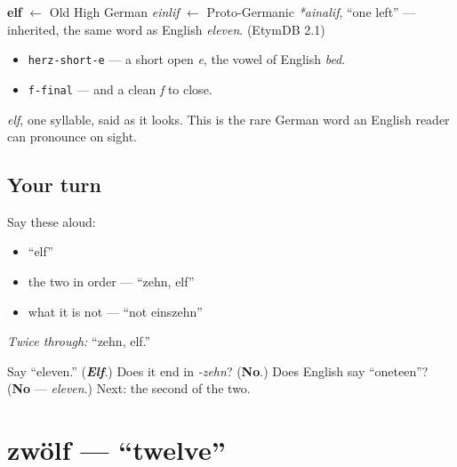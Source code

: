 \begin{cousinweb}
\textbf{elf} $\leftarrow$ Old High German \emph{einlif} $\leftarrow$ Proto-Germanic \emph{*ainalif}, \textquotedblleft{}one left\textquotedblright{} — inherited, the same word as English \emph{eleven}. (EtymDB 2.1)
\end{cousinweb}

\begin{sounds}
\begin{itemize}
\raggedright
  \item \texttt{herz-short-e} — a short open \emph{e}, the vowel of English \emph{bed}.
  \item \texttt{f-final} — and a clean \emph{f} to close.
\end{itemize}

\emph{elf}, one syllable, said as it looks. This is the rare German word an English reader can pronounce on sight.
\end{sounds}

\subsection*{Your turn}
Say these aloud:

\begin{itemize}
\raggedright
  \item \textquotedblleft{}elf\textquotedblright{}
  \item the two in order — \textquotedblleft{}zehn, elf\textquotedblright{}
  \item what it is not — \textquotedblleft{}not einszehn\textquotedblright{}
\end{itemize}

\emph{Twice through:} \textquotedblleft{}zehn, elf.\textquotedblright{}

\begin{tcolorbox}[breakable,colback=teal!4,colframe=teal!35!black,title={Before you move on}]
Say \textquotedblleft{}eleven.\textquotedblright{} (\emph{\textbf{Elf}}.) Does it end in \emph{-zehn}? (\textbf{No}.) Does English say \textquotedblleft{}oneteen\textquotedblright{}? (\textbf{No} — \emph{eleven}.) Next: the second of the two.
\end{tcolorbox}
\section[zwölf]{zwölf — \textquotedblleft{}twelve\textquotedblright{}}

\label{lesson:GE-C12-zwoelf}



